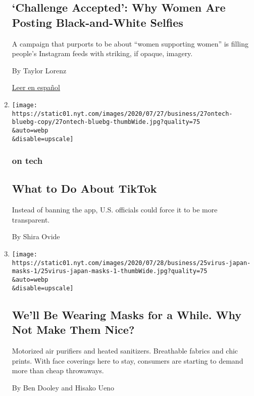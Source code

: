 \begin{enumerate}
{  \subsection{`Challenge Accepted': Why Women Are Posting
  Black-and-White
  Selfies}\label{challenge-accepted-why-women-are-posting-black-and-white-selfies}}

  A campaign that purports to be about ``women supporting women'' is
  filling people's Instagram feeds with striking, if opaque, imagery.

  By Taylor Lorenz

  \href{https://www.nytimes.com/es/2020/07/28/espanol/estilos-de-vida/reto-selfi-blanco-negro.html}{Leer
  en español}
\item
  \href{/2020/07/27/technology/tiktok-data-privacy.html}{}

  \texttt{[image: https://static01.nyt.com/images/2020/07/27/business/27ontech-bluebg-copy/27ontech-bluebg-thumbWide.jpg?quality=75\\\&auto=webp\\\&disable=upscale]}

  \hypertarget{on-tech-2}{%
  \subsubsection{on tech}\label{on-tech-2}}

  \hypertarget{what-to-do-about-tiktok}{%
  \subsection{What to Do About TikTok}\label{what-to-do-about-tiktok}}

  Instead of banning the app, U.S. officials could force it to be more
  transparent.

  By Shira Ovide
\item
  \href{/2020/07/27/business/fashion-masks-coronavirus.html}{}

  \texttt{[image: https://static01.nyt.com/images/2020/07/28/business/25virus-japan-masks-1/25virus-japan-masks-1-thumbWide.jpg?quality=75\\\&auto=webp\\\&disable=upscale]}

  \hypertarget{well-be-wearing-masks-for-a-while-why-not-make-them-nice}{%
  \subsection{We'll Be Wearing Masks for a While. Why Not Make Them
  Nice?}\label{well-be-wearing-masks-for-a-while-why-not-make-them-nice}}

  Motorized air purifiers and heated sanitizers. Breathable fabrics and
  chic prints. With face coverings here to stay, consumers are starting
  to demand more than cheap throwaways.

  By Ben Dooley and Hisako Ueno
\end{enumerate}

